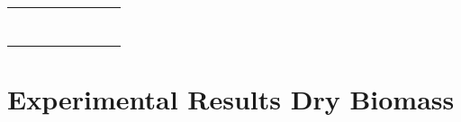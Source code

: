\documentclass[11pt,twocolumn]{article}
\begin{document}
\begin{center}
\begin{tabular}{ccccccccc}
{}	&	{}	&	{}	&	{}	&	{}	&	{}	&	{}	&	{}	&	{}	\\
{}	&	{}	&	{}	&	{}	&	{}	&	{}	&	{}	&	{}	&	{}	\\
{}	&	{}	&	{}	&	{}	&	{}	&	{}	&	{}	&	{}	&	{}	\\
{}	&	{}	&	{}	&	{}	&	{}	&	{}	&	{}	&	{}	&	{}	\\
{}	&	{}	&	{}	&	{}	&	{}	&	{}	&	{}	&	{}	&	{}	\\
{}	&	{}	&	{}	&	{}	&	{}	&	{}	&	{}	&	{}	&	{}	\\
{}	&	{}	&	{}	&	{}	&	{}	&	{}	&	{}	&	{}	&	{}	\\
{}	&	{}	&	{}	&	{}	&	{}	&	{}	&	{}	&	{}	&	{}	\\
\end{tabular}
\end{center}

\section{Experimental Results Dry Biomass}
\end{document}
